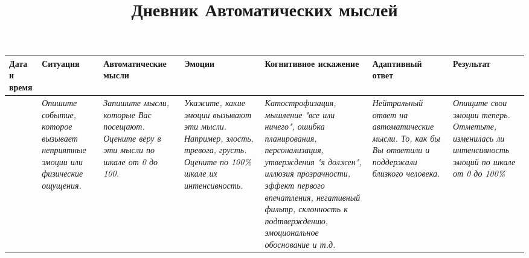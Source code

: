 \documentclass{worksheet_landscape}
\title{Дневник Автоматических мыслей}
\begin{document}
\begin{table}[]
\begin{center}
\renewcommand{\arraystretch}{1.8}
\begin{tabularx}{\textwidth}{|Y|Y|Y|Y|Y|Y|Y|}

\hline
\textbf{Дата и время} & \textbf{Ситуация} & {\textbf{Автоматические мысли}} & \textbf{Эмоции} & \textbf{Когнитивное искажение} & \textbf{Адаптивный ответ} & \textbf{Результат} \\
\hline
&
\vspace{12.7cm}
\small{\textit{Опишите событие, которое вызывает неприятные эмоции или физические
ощущения.}} &
\vspace{12.7cm}
\small{\textit{Запишите мысли, которые Вас посещают. Оцените веру в эти мысли по
    шкале от 0 до 100.}} &
\vspace{11.3cm}
\small{\textit{Укажите, какие эмоции вызывают эти мысли. Например, злость,
    тревога, грусть. Оцените по 100\% шкале их интенсивность.}} &
\vspace{8cm}
\small{\textit{Катострофизация, мышление "все или ничего", ошибка планирования,
    персонализация, утверждения "я должен", иллюзия прозрачности, эффект первого
    впечатления, негативный фильтр, склонность к подтверждению, эмоциональное
    обоснование и т.д.}} &
\vspace{12.3cm}
\small{\textit{Нейтральный ответ на автоматические мысли. То, как бы Вы ответили
    и поддержали близкого человека.}} &
\vspace{11.8cm}
\small{\textit{Опищите свои эмоции теперь. Отметьте, изменилась ли интенсивность
    эмоций по шкале от 0 до 100\%}} \\[435pt]
\hline
\end{tabularx}
\end{center}
\label{tab:activity_diary}
\end{table}
\end{document}
